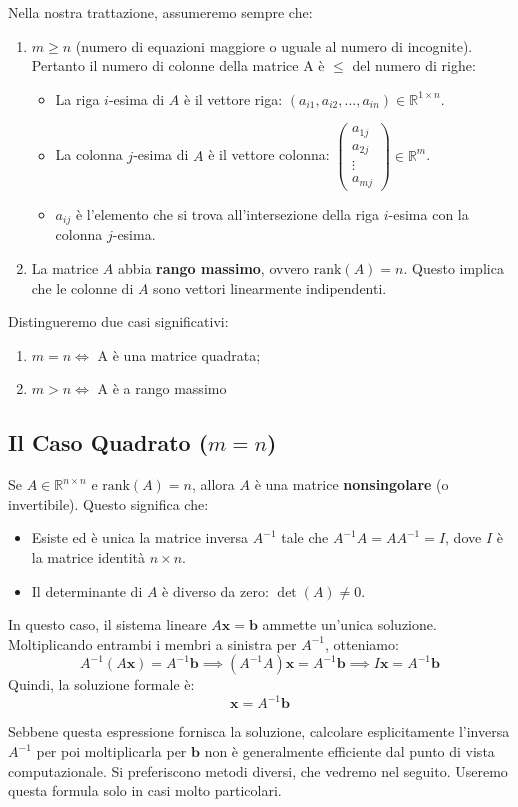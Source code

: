 Nella nostra trattazione, assumeremo sempre che:
\begin{enumerate}
    \item $m \ge n$ (numero di equazioni maggiore o uguale al numero di incognite). Pertanto il numero di colonne della matrice A è $\leq$ del numero di righe:
    \begin{itemize}
        \item La riga $i$-esima di $A$ è il vettore riga: $(a_{i1}, a_{i2}, \dots, a_{in}) \in \mathbb{R}^{1 \times n}$.
        \item La colonna $j$-esima di $A$ è il vettore colonna: $\begin{pmatrix} a_{1j} \\ a_{2j} \\ \vdots \\ a_{mj} \end{pmatrix} \in \mathbb{R}^m$.
        \item $a_{ij}$ è l'elemento che si trova all'intersezione della riga $i$-esima con la colonna $j$-esima.
    \end{itemize}
    \item La matrice $A$ abbia \textbf{rango massimo}, ovvero $\text{rank}(A) = n$. Questo implica che le colonne di $A$ sono vettori linearmente indipendenti.
\end{enumerate}

Distingueremo due casi significativi:
\begin{enumerate}
    \item $m=n \iff$ A è una matrice quadrata;
    \item $m>n \iff$ A è a rango massimo
\end{enumerate}

\subsection{Il Caso Quadrato ($m=n$)}
Se $A \in \mathbb{R}^{n \times n}$ e $\text{rank}(A) = n$, allora $A$ è una matrice \textbf{nonsingolare} (o invertibile). Questo significa che:
\begin{itemize}
    \item Esiste ed è unica la matrice inversa $A^{-1}$ tale che $A^{-1}A = AA^{-1} = I$, dove $I$ è la matrice identità $n \times n$.
    \item Il determinante di $A$ è diverso da zero: $\det(A) \neq 0$.
\end{itemize}
In questo caso, il sistema lineare $A\mathbf{x} = \mathbf{b}$ ammette un'unica soluzione. Moltiplicando entrambi i membri a sinistra per $A^{-1}$, otteniamo:
$$ A^{-1}(A\mathbf{x}) = A^{-1}\mathbf{b} \implies (A^{-1}A)\mathbf{x} = A^{-1}\mathbf{b} \implies I\mathbf{x} = A^{-1}\mathbf{b} $$
Quindi, la soluzione formale è:
$$ \mathbf{x} = A^{-1}\mathbf{b} $$
\begin{osservazione}
Sebbene questa espressione fornisca la soluzione, calcolare esplicitamente l'inversa $A^{-1}$ per poi moltiplicarla per $\mathbf{b}$ non è generalmente efficiente dal punto di vista computazionale. Si preferiscono metodi diversi, che vedremo nel seguito. Useremo questa formula solo in casi molto particolari.
\end{osservazione}


